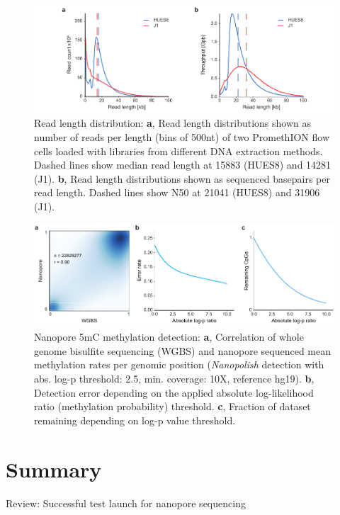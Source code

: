 \begin{figure}[h]
    \centering
    \includegraphics[width=1.0\textwidth]{figures/state_of_art/read_length.pdf}
    \captionsetup{format=plain}
    \caption[Read length median and N50]{Read length distribution: \textbf{a}, Read length distributions shown as number of reads per length (bins of 500nt) of two PromethION flow cells loaded with libraries from different DNA extraction methods. Dashed lines show median read length at 15883 (HUES8) and 14281 (J1). \textbf{b}, Read length distributions shown as sequenced basepairs per read length. Dashed lines show N50 at 21041 (HUES8) and 31906 (J1).}
    \label{fig:state_of_art:read_length}
\end{figure}

\begin{figure}[h]
    \centering
    \includegraphics[width=1.0\textwidth]{figures/state_of_art/methylation.pdf}
    \captionsetup{format=plain}
    \caption[Nanopore methylation detection]{Nanopore 5mC methylation detection: \textbf{a}, Correlation of whole genome bisulfite sequencing (WGBS) and nanopore sequenced mean methylation rates per genomic position (\textit{Nanopolish} detection with abs. log-p threshold: 2.5, min. coverage: 10X, reference hg19). \textbf{b}, Detection error depending on the applied absolute log-likelihood ratio (methylation probability) threshold. \textbf{c}, Fraction of dataset remaining depending on log-p value threshold.}
    \label{fig:state_of_art:methylation}
\end{figure}




\section{Summary}
\label{sec:stat_of_art:summary}


Review: Successful test launch for nanopore sequencing \cite{Loman2015a}






